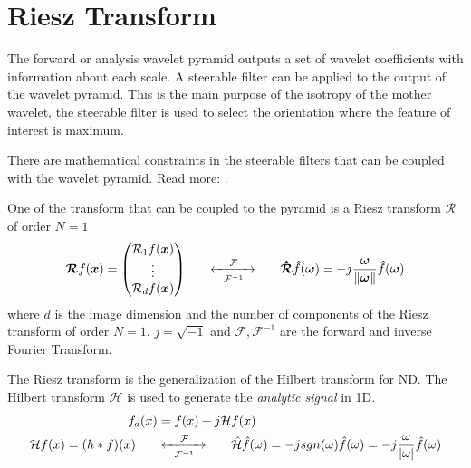 \documentclass{InsightArticle}
\theoremstyle{definition}
\begin{document}
\section{Riesz Transform}
\label{sec:riesz_transform}
The forward or analysis wavelet pyramid outputs a set of wavelet coefficients with information about each scale.
A steerable filter \cite{held_steerable_2010, unser_steerable_2011, simoncelli_steerable_1995} can be applied to the output of the wavelet pyramid. This is the main purpose of the isotropy of the mother wavelet, the steerable filter is used to select the orientation where the feature of interest is maximum.

There are mathematical constraints in the steerable filters that can be coupled with the wavelet pyramid. Read more: \cite{unser_multiresolution_2009, unser_steerable_2011}.

One of the transform that can be coupled to the pyramid is a Riesz transform $\bm{\mathcal{R}}$ of order $N=1$
\begin{equation}
\bm{\mathcal{R}} f(\bm{x}) =
  \begin{pmatrix}
    \mathcal{R}_{1} f(\bm{x}) \\
    \vdots \\
    \mathcal{R}_d f(\bm{x})
  \end{pmatrix}
  \hspace{0.6cm}
  \xleftrightarrow[\mathcal{F}^{-1}]{\hspace{0.4cm}\mathcal{F}\hspace{0.4cm}}
  \hspace{0.6cm}
  \bm{\hat{\mathcal{R}}}\hat{f}(\bm{\omega}) = -j \frac{\bm{\omega}}{\norm{\bm{\omega}}}\hat{f}(\bm{\omega})
\end{equation}
where $d$ is the image dimension and the number of components of the Riesz transform of order $N=1$. $j=\sqrt{-1}$ and $\mathcal{F}, \mathcal{F}^{-1}$ are the forward and inverse Fourier Transform.\newline

The Riesz transform is the generalization of the Hilbert transform for ND. The Hilbert transform $\mathcal{H}$ is used to generate the \textit{analytic signal} in 1D.
\begin{equation}
\label{eq:analytic-signal}
\begin{aligned}
  f_a(x) &= f(x) + j \mathcal{H}f(x) \\
  \mathcal{H}f(x) = (h * f)(x)
  \hspace{0.6cm}
  &\xleftrightarrow[\mathcal{F}^{-1}]{\hspace{0.4cm}\mathcal{F}\hspace{0.4cm}}
  \hspace{0.6cm}
  \hat{\mathcal{H}}\hat{f}(\omega) = -jsgn(\omega)\hat{f}(\omega) = -j \frac{\omega}{\abs{\omega}}\hat{f}(\omega)
\end{aligned}
\end{equation}
\end{document}

